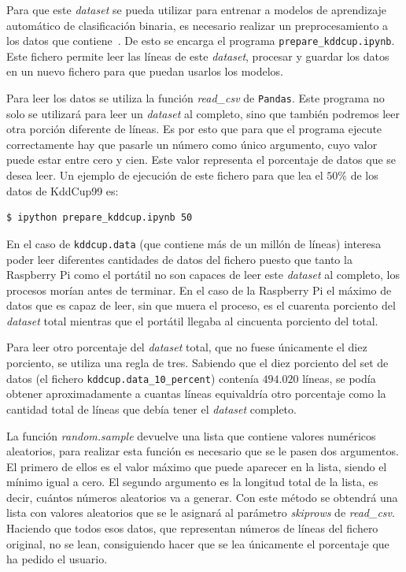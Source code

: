 \documentclass[a4paper, 12pt]{book}
\begin{document}
Para que este \textit{dataset} se pueda utilizar para entrenar a modelos de aprendizaje automático de clasificación binaria, es necesario realizar un preprocesamiento a los datos que contiene~\cite{Pyle1999,Dasu2003}. De esto se encarga el programa \texttt{prepare\_kddcup.ipynb}. Este fichero permite leer las líneas de este \textit{dataset}, procesar y guardar los datos en un nuevo fichero para que puedan usarlos los modelos.

Para leer los datos se utiliza la función \textit{read\_csv} de \texttt{Pandas}. Este programa no solo se utilizará para leer un \textit{dataset} al completo, sino que también podremos leer otra porción diferente de líneas. Es por esto que para que el programa ejecute correctamente hay que pasarle un número como único argumento, cuyo valor puede estar entre cero y cien. Este valor representa el porcentaje de datos que se desea leer. Un ejemplo de ejecución de este fichero para que lea el $50\%$ de los datos de KddCup99 es:\\

\begin{lstlisting}[language=bash]
    $ ipython prepare_kddcup.ipynb 50
\end{lstlisting}

En el caso de \texttt{kddcup.data} (que contiene más de un millón de líneas) interesa poder leer diferentes cantidades de datos del fichero puesto que tanto la Raspberry Pi como el portátil no son capaces de leer este \textit{dataset} al completo, los procesos morían antes de terminar. En el caso de la Raspberry Pi el máximo de datos que es capaz de leer, sin que muera el proceso, es el cuarenta porciento del \textit{dataset} total mientras que el portátil llegaba al cincuenta porciento del total.

Para leer otro porcentaje del \textit{dataset} total, que no fuese únicamente el diez porciento, se utiliza una regla de tres. Sabiendo que el diez porciento del set de datos (el fichero \texttt{kddcup.data\_10\_percent}) contenía $494.020$ líneas, se podía obtener aproximadamente a cuantas líneas equivaldría otro porcentaje como la cantidad total de líneas que debía tener el \textit{dataset} completo.

La función \textit{random.sample} devuelve una lista que contiene valores numéricos aleatorios, para realizar esta función es necesario que se le pasen dos argumentos. El primero de ellos es el valor máximo que puede aparecer en la lista, siendo el mínimo igual a cero. El segundo argumento es la longitud total de la lista, es decir, cuántos números aleatorios va a generar. Con este método se obtendrá una lista con valores aleatorios que se le asignará al parámetro \textit{skiprows} de \textit{read\_csv}. Haciendo que todos esos datos, que representan números de líneas del fichero original, no se lean, consiguiendo hacer que se lea únicamente el porcentaje que ha pedido el usuario.
\end{document}
